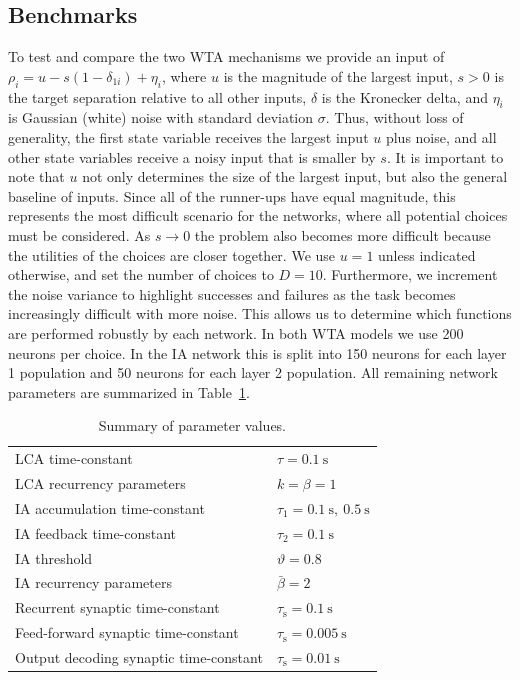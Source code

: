 \documentclass[10pt,letterpaper]{article}
\begin{document}
\subsection{Benchmarks}
To test and compare the two WTA mechanisms we provide an input of $\rho_i = u - s(1 - \delta_{1i}) + \eta_i$, where $u$ is the magnitude of the largest input, $s > 0$ is the target separation relative to all other inputs, $\delta$ is the Kronecker delta, and $\eta_i$ is Gaussian (white) noise with standard deviation $\sigma$.
Thus, without loss of generality, the first state variable receives the largest input $u$ plus noise, and all other state variables receive a noisy input that is smaller by $s$.
It is important to note that $u$ not only determines the size of the largest input, but also the general baseline of inputs.
Since all of the runner-ups have equal magnitude, this represents the most difficult scenario for the networks, where all potential choices must be considered.
As $s \rightarrow 0$ the problem also becomes more difficult because the utilities of the choices are closer together.
We use $u = 1$ unless indicated otherwise, and set the number of choices to $D = 10$.
Furthermore, we increment the noise variance to highlight successes and failures as the task becomes increasingly difficult with more noise.
This allows us to determine which functions are performed robustly by each network.
In both WTA models we use 200 neurons per choice.
In the IA network this is split into 150 neurons for each layer 1 population and 50 neurons for each layer 2 population.
All remaining network parameters are summarized in Table~\ref{tbl:params}.
\begin{table}
    \caption{Summary of parameter values.}\label{tbl:params}
    \begin{tabular}{ll}
        LCA time-constant & $\tau = \SI{0.1}{\second}$ \\
        LCA recurrency parameters & $k = \beta = 1$ \\
        IA accumulation time-constant & $\tau_1 = \SI{0.1}{\second},\ \SI{0.5}{\second}$ \\
        IA feedback time-constant & $\tau_2 = \SI{0.1}{\second}$ \\
        IA threshold & $\vartheta = 0.8$ \\
        IA recurrency parameters & $\bar{\beta} = 2$ \\
        Recurrent synaptic time-constant & $\tau_{\mathrm{s}} 
        = \SI{0.1}{\second}$ \\
        Feed-forward synaptic time-constant & $\tau_{\mathrm{s}} 
        = \SI{0.005}{\second}$ \\
        Output decoding synaptic time-constant & $\tau_{\mathrm{s}} 
        = \SI{0.01}{\second}$
    \end{tabular}
\end{table}
\end{document}
